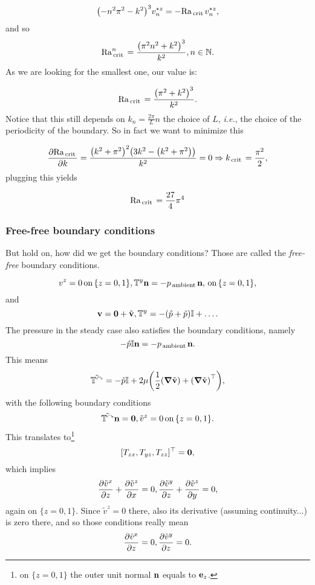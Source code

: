 \documentclass[reqno, a4paper]{article}
\begin{document}
\[
	\qty(-n^{2} \pi^{2} - k^{2})^{3}v^{*z}_n = -\mathrm{Ra}_{\, \text{crit} \,}v^{*z}_n,
\]
and so 
\[
	\mathrm{Ra}^n_{\, \text{crit} \,} = \frac{\qty(\pi^{2}n^{2}+k^{2})^{3}}{k^{2}}, n \in {\mathbb N}.
\]
As we are looking for the smallest one, our value is:

\[
	\mathrm{Ra}_{\, \text{crit} \,} = \frac{\qty(\pi^{2}+k^{2})^{3}}{k^{2}}.
\]
Notice that this still depends on $k_n = \frac{2 \pi}{L}n$ the choice of $L$, \textit{i.e.}, the choice of the periodicity of the boundary. So in fact we want to minimize this

\[
	\pdv{\mathrm{Ra}_{\, \text{crit} \,}}{k} = \frac{\qty(k^{2}+\pi^{2})^{2}\qty(3k^{2}-\qty(k^{2}+\pi^{2}))}{k^{2}} = 0 \Rightarrow k_{\, \text{crit} \,} = \frac{\pi^{2}}{2},
\]
plugging this yields

\begin{equation}
    \label{eq:Rayileigh_crit}
    \mathrm{Ra}_{\, \text{crit} \,} = \frac{27}{4}\pi^4 
\end{equation}

\subsubsection{Free-free boundary conditions}
\label{sec:free_free}

But hold on, how did we get the boundary conditions? Those are called the \textit{free-free} boundary conditions.

\[
	v^z = 0 \, \text{on} \,\{z = 0,1 \},\mathbb{T}^y \vb{n} = - p_{\, \text{ambient} \,} \vb{n},\, \text{on} \, \{z = 0,1\},
\]
and
\[
	\vb{v} = \vb{0} + \tilde{\vb{v}}, \mathbb{T}^y = -\qty(\hat{p}+\tilde{p})\mathbb{I} + \dots.
\]
The pressure in the steady case also satisfies the boundary conditions, namely
\[
	-\hat{p}\mathbb{I} \vb{n} = - p_{\, \text{ambient} \,}\vb{n}.
\]
This means
\[
	\tilde{\mathbb{T}^y}= - \tilde{p}\mathbb{I} + 2 \mu\qty(\frac{1}{2}\qty(\grad \tilde{\vb{v}})+\qty(\grad \tilde{\vb{v}})^\top),
\]
with the following boundary conditions
\[
	\tilde{\mathbb{T}^y}\vb{n} = \vb{0} , \tilde{v}^z = 0 \, \text{on} \, \{z = 0,1\}.
\]
This translates to\footnote{on $\{z = 0,1\}$ the outer unit normal $\vb{n}$ equals to $\vb{e}_z$.}
\[
	[T_{zx}, T_{yz}, T_{zz}]^\top = \vb{0},
\]
which implies
\[
	\pdv{\tilde{v}^x}{z} + \pdv{\tilde{v}^z}{x} = 0, \pdv{\tilde{v}^y}{z}+ \pdv{\tilde{v}^z}{y} = 0,
\]
again on $\{z = 0,1\}.$ Since $\tilde{v}^z = 0$ there, also its derivative (assuming continuity...) is zero there, and so those conditions really mean
\[
	\pdv{\tilde{v}^x}{z} = 0, \pdv{\tilde{v}^y}{z} = 0.
\]
\end{document}
